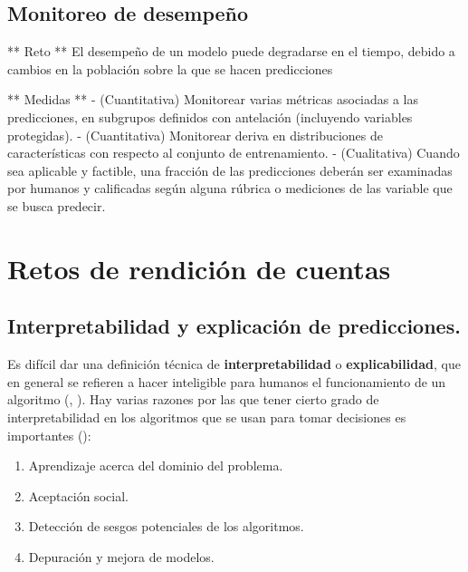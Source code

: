 \documentclass[
]{book}
\providecommand{\tightlist}{%
  \setlength{\itemsep}{0pt}\setlength{\parskip}{0pt}}
\begin{document}
\hypertarget{monitoreo-de-desempeuxf1o}{%
\section{Monitoreo de desempeño}\label{monitoreo-de-desempeuxf1o}}

** Reto **
El desempeño de un modelo puede degradarse en el tiempo, debido a cambios en la población sobre la que se
hacen predicciones

** Medidas **
- (Cuantitativa) Monitorear varias métricas asociadas a las predicciones, en subgrupos definidos con antelación
(incluyendo variables protegidas).
- (Cuantitativa) Monitorear deriva en distribuciones de características con respecto al conjunto de entrenamiento.
- (Cualitativa) Cuando sea aplicable y factible, una fracción de las predicciones deberán ser examinadas por humanos y calificadas
según alguna rúbrica o mediciones de las variable que se busca predecir.

\hypertarget{retos-de-rendiciuxf3n-de-cuentas}{%
\chapter{Retos de rendición de cuentas}\label{retos-de-rendiciuxf3n-de-cuentas}}

\hypertarget{interpretabilidad-y-explicaciuxf3n-de-predicciones.}{%
\section{Interpretabilidad y explicación de predicciones.}\label{interpretabilidad-y-explicaciuxf3n-de-predicciones.}}

Es difícil dar una definición técnica de \textbf{interpretabilidad} o \textbf{explicabilidad}, que en general se refieren
a hacer inteligible para humanos el funcionamiento de un algoritmo (\citep{molnar2019}, \citep{miller}). Hay varias razones
por las que tener cierto grado de interpretabilidad en los algoritmos que se usan para tomar decisiones es importantes (\citep{molnar2019}):

\begin{enumerate}
\def\labelenumi{\arabic{enumi}.}
\tightlist
\item
  Aprendizaje acerca del dominio del problema.
\item
  Aceptación social.
\item
  Detección de sesgos potenciales de los algoritmos.
\item
  Depuración y mejora de modelos.
\end{enumerate}
\end{document}
